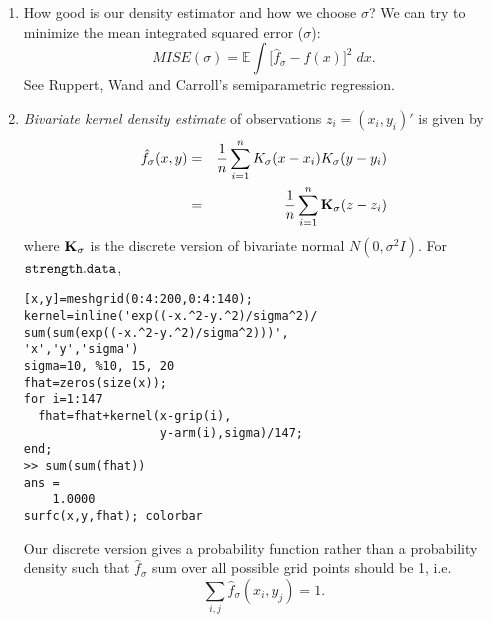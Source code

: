 \documentclass[10pt,twocolumn]{article} %
\newcommand{\bqn}{\begin{eqnarray*}}
\newcommand{\eqn}{\end{eqnarray*}}
\begin{document}
\begin{enumerate}
\item How good is our density estimator and how we choose
$\sigma$? We can try to minimize the mean integrated squared error
($\sigma$):
$$MISE(\sigma) = \mathbb{E} \int \big[ \hat f_{\sigma} - f(x)\big]^2 \;dx.$$
See Ruppert, Wand and Carroll's semiparametric regression.

\item {\em Bivariate kernel density estimate} of observations
$z_i=(x_i,y_i)'$ is given by \bqn \hat f_{\sigma}(x,y)
&=&\frac{1}{n}\sum_{i=1}^n
K_{\sigma}(x-x_i)K_{\sigma}(y-y_i)\\
&=& \frac{1}{n}\sum_{i=1}^n {\bf K}_{\sigma}(z-z_i)\eqn where
${\bf K}_{\sigma}$ is the discrete version of bivariate normal
$N(0,\sigma^2I)$. For $\tt{strength.data}$,
\begin{verbatim}
[x,y]=meshgrid(0:4:200,0:4:140);
kernel=inline('exp((-x.^2-y.^2)/sigma^2)/
sum(sum(exp((-x.^2-y.^2)/sigma^2)))',
'x','y','sigma')
sigma=10, %10, 15, 20
fhat=zeros(size(x));
for i=1:147
  fhat=fhat+kernel(x-grip(i),
                   y-arm(i),sigma)/147;
end;
>> sum(sum(fhat))
ans =
    1.0000
surfc(x,y,fhat); colorbar
\end{verbatim}
Our discrete version gives a probability function rather than a
probability density such that $\hat f_{\sigma}$ sum over all
possible grid points should be 1, i.e.
$$\sum_{i,j} \hat f_{\sigma}(x_i,y_j) =1.$$

\end{enumerate}
\end{document}
